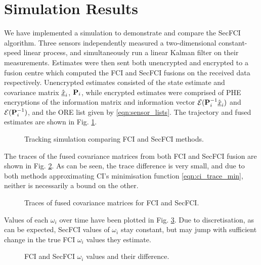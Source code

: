\documentclass[letterpaper, 10 pt, conference]{ieeeconf}  %
\begin{document}
\section{Simulation Results} \label{sec:results}
We have implemented a simulation to demonstrate and compare the SecFCI algorithm. Three sensors independently measured a two-dimensional constant-speed linear process, and simultaneously run a linear Kalman filter on their measurements. Estimates were then sent both unencrypted and encrypted to a fusion centre which computed the FCI and SecFCI fusions on the received data respectively. Unencrypted estimates consisted of the state estimate and covariance matrix $\hat{{\underline{x}}}_i$, ${{\mathbf{P}}}_i$, while encrypted estimates were comprised of PHE encryptions of the information matrix and information vector $\mathcal{E}({{\mathbf{P}}}^{-1}_i\hat{{\underline{x}}}_i)$ and $\mathcal{E}({{\mathbf{P}}}^{-1}_i)$, and the ORE list given by \eqref{eqn:sensor_lists}. The trajectory and fused estimates are shown in Fig. \ref{fig:fci_secfci_traj}.
\begin{figure}[tb]
   \vspace{-5pt}
   \begin{center}
      
   \end{center}
   \vspace{-10pt}
   \caption{Tracking simulation comparing FCI and SecFCI methods.}
   \label{fig:fci_secfci_traj}
\end{figure}

The traces of the fused covariance matrices from both FCI and SecFCI fusion are shown in Fig. \ref{fig:fci_secfci_trace}. As can be seen, the trace difference is very small, and due to both methods approximating CI's minimisation function \eqref{eqn:ci_trace_min}, neither is necessarily a bound on the other.
\begin{figure}[tb]
   \vspace{-5pt}
   \begin{center}
      
   \end{center}
   \vspace{-10pt}
   \caption{Traces of fused covariance matrices for FCI and SecFCI.}
   \label{fig:fci_secfci_trace}
\end{figure}
Values of each $\omega_i$ over time have been plotted in Fig. \ref{fig:fci_secfci_omegas}. Due to discretisation, as can be expected, SecFCI values of $\omega_i$ stay constant, but may jump with sufficient change in the true FCI $\omega_i$ values they estimate.
\begin{figure}[tb]
   \vspace{-5pt}
   \begin{center}
      
   \end{center}
   \vspace{-10pt}
   \caption{FCI and SecFCI $\omega_i$ values and their difference.}
   \label{fig:fci_secfci_omegas}
\end{figure}
\end{document}
